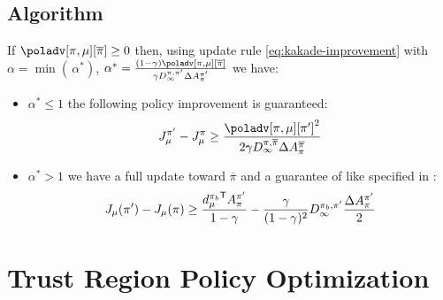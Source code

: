 \subsection{Algorithm}
\begin{theorem}
If $\poladv[\pi, \mu][\overline{\pi}] \geq 0$ then, using update rule \ref{eq:kakade-improvement} with $\alpha = \min(\, \alpha^*)$, $\alpha^* = \frac{(1-\gamma)\poladv[\pi, \mu][\overline{\pi}]}{\gamma D_\infty^{\pi, \pi'}\Delta A_\pi^{\pi'}}$ we have:
\begin{itemize}
\item $\alpha^* \leq 1$ the following policy improvement is guaranteed:
\[
J_\mu^{\pi'} - J_\mu^\pi \geq \frac{{\poladv[\pi, \mu][\pi']}^2}{2\gamma D_\infty^{\pi, \overline{\pi}}\Delta A_\pi^{\overline{\pi}}}
\]
\item $\alpha^* > 1$ we have a full update toward $\overline{\pi}$ and a guarantee of like specified in :
\begin{equation}
J_{\mu}(\pi') - J_\mu(\pi) \geq \frac{{d_\mu^{\pi_b}}^{\mathsf{T}}A_\pi^{\pi'}}{1-\gamma} - \frac{\gamma}{(1-\gamma)^2}{D_\infty^{\pi_b, \pi'}} \frac{\Delta A_{\pi}^{\pi'}}{2}
\end{equation}
\end{itemize}
\end{theorem}


\section{Trust Region Policy Optimization}
\label{sec:trpo}